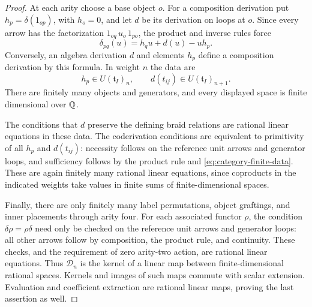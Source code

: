 \begin{proof}
At each arity choose a base object $o$.  For a composition derivation
put $h_p=\delta(1_{op})$, with $h_o=0$, and let $d$ be its derivation on
loops at $o$.  Since every arrow has the factorization
$1_{oq}\,u_o\,1_{po}$, the product and inverse rules force
\begin{equation}\label{eq:category-finite-data}
 \delta_{pq}(u)=h_qu+d(u)-uh_p.
\end{equation}
Conversely, an algebra derivation $d$ and elements $h_p$ define a
composition derivation by this formula.  In weight $n$ the data are
\[
 h_p\in U(\mathfrak t_I)_n,
 \qquad d(t_{ij})\in U(\mathfrak t_I)_{n+1}.
\]
There are finitely many objects and generators, and every displayed
space is finite dimensional over $\mathbb Q$.

The conditions that $d$ preserve the defining braid relations are
rational linear equations in these data.  The coderivation conditions
are equivalent to primitivity of all $h_p$ and $d(t_{ij})$: necessity
follows on the reference unit arrows and generator loops, and
sufficiency follows by the product rule and
\eqref{eq:category-finite-data}.  These are again finitely many rational
linear equations, since coproducts in the indicated weights take
values in finite sums of finite-dimensional spaces.

Finally, there are only finitely many label permutations, object
graftings, and inner placements through arity four.  For each associated
functor $\rho$, the condition $\delta\rho=\rho\delta$ need only be
checked on the reference unit arrows and generator loops: all other
arrows follow by composition, the product rule, and continuity.
These checks, and the requirement of zero arity-two action, are
rational linear equations.  Thus $\mathcal D_n$ is the kernel of a
linear map between finite-dimensional rational spaces.  Kernels and
images of such maps commute with scalar extension.  Evaluation and
coefficient extraction are rational linear maps, proving the last
assertion as well.
\end{proof}
